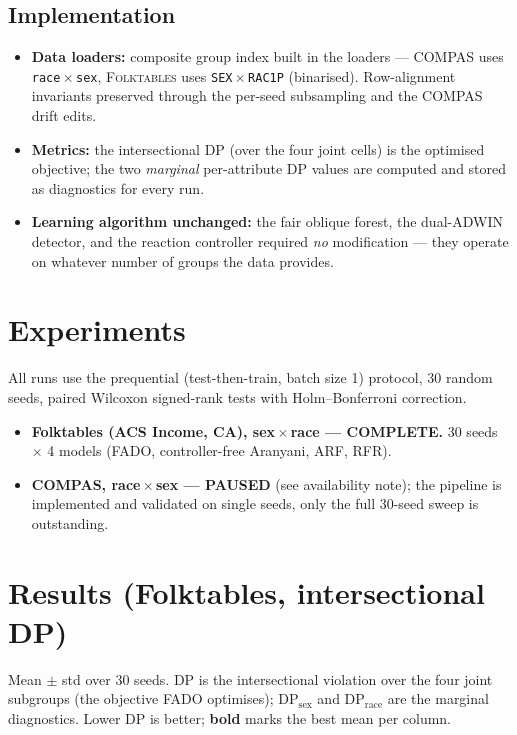 \documentclass[11pt,a4paper]{article}
\newcommand{\note}[1]{{\color{acc}\textbf{#1}}}
\begin{document}
\subsection*{Implementation}
\begin{itemize}
  \item \textbf{Data loaders:} composite group index built in the loaders ---
        \textsc{COMPAS} uses \texttt{race}\,$\times$\,\texttt{sex},
        \textsc{Folktables} uses \texttt{SEX}\,$\times$\,\texttt{RAC1P} (binarised).
        Row-alignment invariants preserved through the per-seed subsampling and the
        \textsc{COMPAS} drift edits.
  \item \textbf{Metrics:} the intersectional DP (over the four joint cells) is the optimised
        objective; the two \emph{marginal} per-attribute DP values are computed and stored as
        diagnostics for every run.
  \item \textbf{Learning algorithm unchanged:} the fair oblique forest, the dual-ADWIN
        detector, and the reaction controller required \emph{no} modification --- they operate
        on whatever number of groups the data provides.
\end{itemize}

\section{Experiments}
All runs use the prequential (test-then-train, batch size 1) protocol, 30 random seeds,
paired Wilcoxon signed-rank tests with Holm--Bonferroni correction.
\begin{itemize}
  \item \note{Folktables (ACS Income, CA), sex\,$\times$\,race --- COMPLETE.}
        30 seeds $\times$ 4 models (FADO, controller-free Aranyani, ARF, RFR).
  \item \note{COMPAS, race\,$\times$\,sex --- PAUSED} (see availability note); the pipeline is
        implemented and validated on single seeds, only the full 30-seed sweep is outstanding.
\end{itemize}

\section{Results (Folktables, intersectional DP)}
Mean $\pm$ std over 30 seeds. DP is the intersectional violation over the four joint
subgroups (the objective \textsc{FADO} optimises); $\mathrm{DP}_{\text{sex}}$ and
$\mathrm{DP}_{\text{race}}$ are the marginal diagnostics. Lower DP is better; \textbf{bold}
marks the best mean per column.
\end{document}
